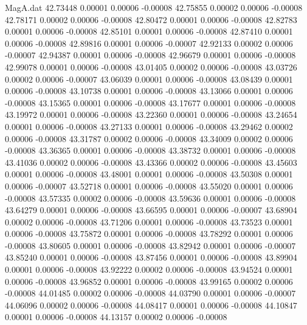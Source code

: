 \begin{filecontents}{MagA.dat}
  42.73448    0.00001    0.00006   -0.00008
  42.75855    0.00002    0.00006   -0.00008
  42.78171    0.00002    0.00006   -0.00008
  42.80472    0.00001    0.00006   -0.00008
  42.82783    0.00001    0.00006   -0.00008
  42.85101    0.00001    0.00006   -0.00008
  42.87410    0.00001    0.00006   -0.00008
  42.89816    0.00001    0.00006   -0.00007
  42.92133    0.00002    0.00006   -0.00007
  42.94387    0.00001    0.00006   -0.00008
  42.96679    0.00001    0.00006   -0.00008
  42.99078    0.00001    0.00006   -0.00008
  43.01405    0.00002    0.00006   -0.00008
  43.03726    0.00002    0.00006   -0.00007
  43.06039    0.00001    0.00006   -0.00008
  43.08439    0.00001    0.00006   -0.00008
  43.10738    0.00001    0.00006   -0.00008
  43.13066    0.00001    0.00006   -0.00008
  43.15365    0.00001    0.00006   -0.00008
  43.17677    0.00001    0.00006   -0.00008
  43.19972    0.00001    0.00006   -0.00008
  43.22360    0.00001    0.00006   -0.00008
  43.24654    0.00001    0.00006   -0.00008
  43.27133    0.00001    0.00006   -0.00008
  43.29462    0.00002    0.00006   -0.00008
  43.31787    0.00002    0.00006   -0.00008
  43.34009    0.00002    0.00006   -0.00008
  43.36365    0.00001    0.00006   -0.00008
  43.38732    0.00001    0.00006   -0.00008
  43.41036    0.00002    0.00006   -0.00008
  43.43366    0.00002    0.00006   -0.00008
  43.45603    0.00001    0.00006   -0.00008
  43.48001    0.00001    0.00006   -0.00008
  43.50308    0.00001    0.00006   -0.00007
  43.52718    0.00001    0.00006   -0.00008
  43.55020    0.00001    0.00006   -0.00008
  43.57335    0.00002    0.00006   -0.00008
  43.59636    0.00001    0.00006   -0.00008
  43.64279    0.00001    0.00006   -0.00008
  43.66595    0.00001    0.00006   -0.00007
  43.68904    0.00002    0.00006   -0.00008
  43.71206    0.00001    0.00006   -0.00008
  43.73523    0.00001    0.00006   -0.00008
  43.75872    0.00001    0.00006   -0.00008
  43.78292    0.00001    0.00006   -0.00008
  43.80605    0.00001    0.00006   -0.00008
  43.82942    0.00001    0.00006   -0.00007
  43.85240    0.00001    0.00006   -0.00008
  43.87456    0.00001    0.00006   -0.00008
  43.89904    0.00001    0.00006   -0.00008
  43.92222    0.00002    0.00006   -0.00008
  43.94524    0.00001    0.00006   -0.00008
  43.96852    0.00001    0.00006   -0.00008
  43.99165    0.00002    0.00006   -0.00008
  44.01485    0.00002    0.00006   -0.00008
  44.03790    0.00001    0.00006   -0.00007
  44.06096    0.00002    0.00006   -0.00008
  44.08417    0.00001    0.00006   -0.00008
  44.10847    0.00001    0.00006   -0.00008
  44.13157    0.00002    0.00006   -0.00008

\end{filecontents}
